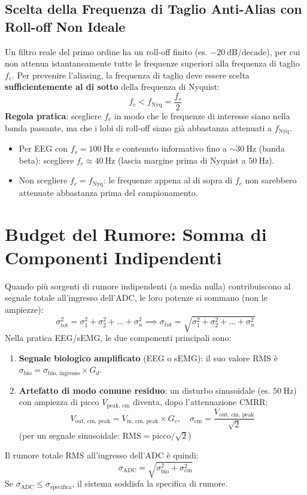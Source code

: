 \documentclass[10pt, letterpaper]{report}
\begin{document}
\subsection{Scelta della Frequenza di Taglio Anti-Alias con Roll-off Non Ideale}
Un filtro reale del primo ordine ha un roll-off finito (es. $-20\ \text{dB/decade}$), per cui non attenua istantaneamente tutte le frequenze superiori alla frequenza di taglio $f_c$.
Per prevenire l'aliasing, la frequenza di taglio deve essere scelta \textbf{sufficientemente al di sotto} della frequenza di Nyquist:
\[
f_c < f_{\text{Nyq}} = \frac{f_s}{2}
\]
\textbf{Regola pratica}: scegliere $f_c$ in modo che le frequenze di interesse siano nella banda passante, ma che i lobi di roll-off siano già abbastanza attenuati a $f_{\text{Nyq}}$.
\begin{itemize}
    \item Per EEG con $f_s = 100\ \text{Hz}$ e contenuto informativo fino a $\sim 30\ \text{Hz}$ (banda beta): scegliere $f_c \approx 40\ \text{Hz}$ (lascia margine prima di Nyquist a $50\ \text{Hz}$).
    \item Non scegliere $f_c = f_{\text{Nyq}}$: le frequenze appena al di sopra di $f_c$ non sarebbero attenuate abbastanza prima del campionamento.
\end{itemize}

\section{Budget del Rumore: Somma di Componenti Indipendenti}
Quando più sorgenti di rumore indipendenti (a media nulla) contribuiscono al segnale totale all'ingresso dell'ADC, le loro potenze si sommano (non le ampiezze):
\[
\sigma_{\text{tot}}^2 = \sigma_1^2 + \sigma_2^2 + \ldots + \sigma_n^2 \implies \sigma_{\text{tot}} = \sqrt{\sigma_1^2 + \sigma_2^2 + \ldots + \sigma_n^2}
\]
Nella pratica EEG/sEMG, le due componenti principali sono:
\begin{enumerate}
    \item \textbf{Segnale biologico amplificato} (EEG o sEMG): il suo valore RMS è $\sigma_{\text{bio}} = \sigma_{\text{bio, ingresso}} \times G_d$.
    \item \textbf{Artefatto di modo comune residuo}: un disturbo sinusoidale (es. $50\ \text{Hz}$) con ampiezza di picco $V_{\text{peak, cm}}$ diventa, dopo l'attenuazione CMRR:
    \[
    V_{\text{out, cm, peak}} = V_{\text{in, cm, peak}} \times G_c, \quad \sigma_{\text{cm}} = \frac{V_{\text{out, cm, peak}}}{\sqrt{2}}
    \]
    (per un segnale sinusoidale: $\text{RMS} = \text{picco} / \sqrt{2}$)
\end{enumerate}
Il rumore totale RMS all'ingresso dell'ADC è quindi:
\[
\boxed{\sigma_{\text{ADC}} = \sqrt{\sigma_{\text{bio}}^2 + \sigma_{\text{cm}}^2}}
\]
Se $\sigma_{\text{ADC}} \leq \sigma_{\text{specifica}}$, il sistema soddisfa la specifica di rumore.
\end{document}
